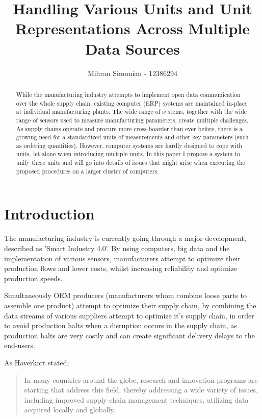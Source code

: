 \documentclass[sigchi, nonacm]{acmart}
\begin{document}
\title{Handling Various Units and Unit Representations Across Multiple Data Sources}
\author{Mihran Simonian - 12386294}

\begin{abstract}
    While the manufacturing industry attempts to implement open data communication over the whole supply chain, existing computer (ERP) systems are maintained in-place at individual manufacturing plants. The wide range of systems, together with the wide range of sensors used to measure manufacturing parameters, create multiple challenges. As supply chains operate and procure more cross-boarder than ever before, there is a growing need for a standardized units of measurements and other key parameters (such as ordering quantities). However, computer systems are hardly designed to cope with units, let alone when introducing multiple units. In this paper I propose a system to unify these units and will go into details of issues that might arise when executing the proposed procedures on a larger cluster of computers.
\end{abstract}

\maketitle


\section{Introduction}
The manufacturing industry is currently going through a major development, described as 'Smart Industry 4.0'\cite{lee2014service}. By using computers, big data and the implementation of various sensors, manufacturers attempt to optimize their production flows and lower costs, whilst increasing reliability and optimize production speeds.

Simultaneously OEM producers (manufacturers whom combine loose parts to assemble one product) attempt to optimize their supply chain, by combining the data streams of various suppliers attempt to optimize it's supply chain, in order to avoid production halts when a disruption occurs in the supply chain, as production halts are very costly and can create significant delivery delays to the end-users. 

As Haverkort stated\cite{haverkort2017smart};
\begin{quote}
    In many countries around the globe, research and innovation programs are starting that address this field, thereby addressing a wide variety of issues, including improved supply-chain management techniques, utilizing data acquired locally and globally.
\end{quote}
\end{document}
